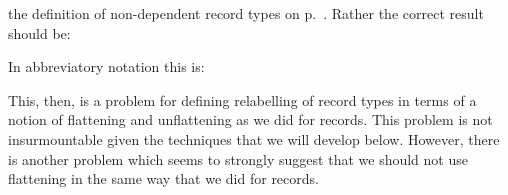 the definition of non-dependent record types on
p.~\pageref{cl:ndrectype-emb}.  Rather the correct result should be:
\begin{quote}
\end{quote}
In abbreviatory notation this is:
\begin{quote}
\end{quote}

This, then, is a problem for defining relabelling of record types in
terms of a notion of flattening and unflattening as we did for
records.  This problem is not insurmountable given the techniques that
we will develop below.  However, there is another problem which seems
to strongly suggest that we should not use flattening in the same way
that we did for records.




